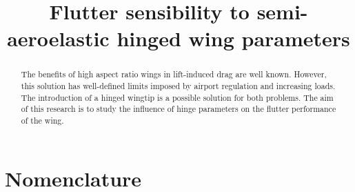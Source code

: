 \documentclass[conference]{IEEEtran}
\begin{document}
%
\title{Flutter sensibility to semi-aeroelastic hinged wing parameters}

% 
\author{
}




\maketitle



\begin{abstract}
The benefits of high aspect ratio wings in lift-induced drag are well known. However, this solution has well-defined limits imposed by airport regulation and increasing loads. The introduction of a hinged wingtip is a possible solution for both problems. The aim of this research is to study the influence of hinge parameters on the flutter performance of the wing.
\end{abstract}

\IEEEpeerreviewmaketitle

\section*{Nomenclature}
\end{document}
